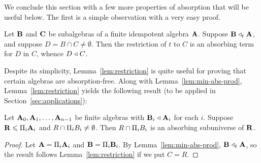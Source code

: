 We conclude this section with a few more properties of absorption that will 
be useful below.
The first is a simple observation with a very easy proof.
\begin{lemma}
\label{lem:restriction}
Let $\mathbf{B}$ and $\mathbf{C}$ be subalgebras of a finite idempotent algebra $\mathbf{A}$.
Suppose $\mathbf{B} \mathrel{\triangleleft}_t \mathbf{A}$, and suppose $D = B\cap C \neq \emptyset$.
Then the restriction of $t$ to $C$ is an absorbing term for $D$ in $C$, whence 
$D\mathrel{\triangleleft} C$.
\end{lemma}
Despite its simplicity, Lemma~\ref{lem:restriction} is quite useful for
proving that certain algebras are absorption-free.
Along with Lemma~\ref{lem:min-abs-prod}, Lemma~\ref{lem:restriction} 
yields the following result (to be applied in Section~\ref{sec:applications}):
\begin{lemma}
\label{lem:gen-abs1}
Let $\mathbf{A}_0, \mathbf{A}_1, \dots, \mathbf{A}_{n-1}$ be finite algebras with $\mathbf{B}_i\mathrel{\triangleleft} \mathbf{A}_i$ for each $i$.
Suppose $\mathbf{R} \leqslant \Pi_{i}\mathbf{A}_i$ and $R \cap \Pi_i B_i \neq \emptyset$.
Then $R \cap \Pi_i B_i$ is an absorbing subuniverse of $\mathbf{R}$.
\end{lemma}
\begin{proof}
  Let $\mathbf{A} = \Pi_i \mathbf{A}_i$ and $\mathbf{B} = \Pi_i \mathbf{B}_i$.
  By Lemma~\ref{lem:min-abs-prod}, $\mathbf{B} \mathrel{\triangleleft}_t \mathbf{A}$, so the result
  follows Lemma~\ref{lem:restriction} if we put $C = R$.
\end{proof}

